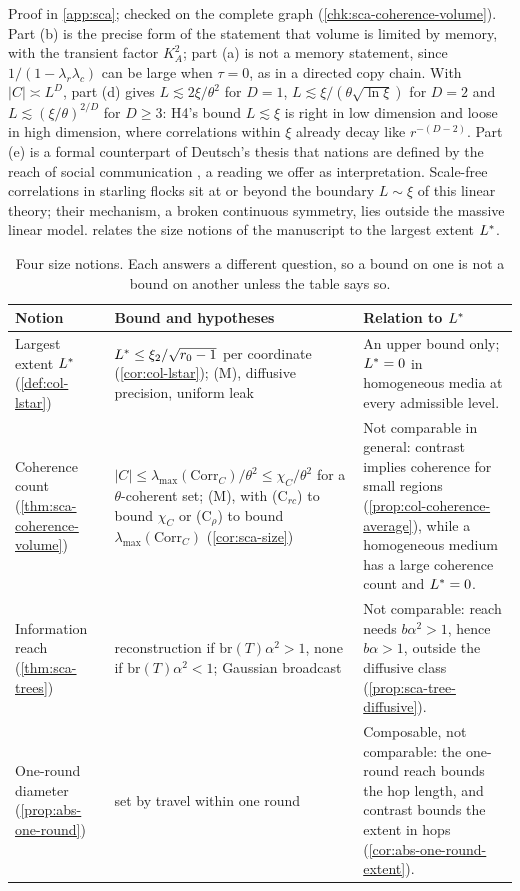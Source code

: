Proof in \cref{app:sca}; checked on the complete graph (\cref{chk:sca-coherence-volume}). Part (b) is the precise form of the statement that volume is limited by memory, with the transient factor $K_A^2$; part (a) is not a memory statement, since $1/(1-\lambda_r\lambda_c)$ can be large when $\tau=0$, as in a directed copy chain. With $|C|\asymp L^D$, part (d) gives $L\lesssim2\xi/\theta^2$ for $D=1$, $L\lesssim\xi/(\theta\sqrt{\ln\xi})$ for $D=2$ and $L\lesssim(\xi/\theta)^{2/D}$ for $D\ge3$: H4's bound $L\lesssim\xi$ is right in low dimension and loose in high dimension, where correlations within $\xi$ already decay like $r^{-(D-2)}$. Part (e) is a formal counterpart of Deutsch's thesis that nations are defined by the reach of social communication \citep{deutsch1953nationalism}, a reading we offer as interpretation. Scale-free correlations in starling flocks \citep{cavagna2010scale} sit at or beyond the boundary $L\sim\xi$ of this linear theory; their mechanism, a broken continuous symmetry, lies outside the massive linear model.  relates the size notions of the manuscript to the largest extent $L^{\ast}$.

\begin{table}[t]
\centering
\small
\begin{tabular}{@{}>{\raggedright\arraybackslash}p{}>{\raggedright\arraybackslash}p{}>{\raggedright\arraybackslash}p{}@{}}
\toprule
Notion & Bound and hypotheses & Relation to $L^{\ast}$\\
\midrule
Largest extent $L^{\ast}$ (\cref{def:col-lstar}) & $L^{\ast}\le\xi_2/\sqrt{r_0-1}$ per coordinate (\cref{cor:col-lstar}); \textup{(M)}, diffusive precision, uniform leak & An upper bound only; $L^{\ast}=0$ in homogeneous media at every admissible level.\\
Coherence count (\cref{thm:sca-coherence-volume}) & $|C|\le\lambda_{\max}(\mathrm{Corr}_C)/\theta^2\le\chi_C/\theta^2$ for a $\theta$-coherent set; \textup{(M)}, with \textup{(C$_{rc}$)} to bound $\chi_C$ or \textup{(C$_\rho$)} to bound $\lambda_{\max}(\mathrm{Corr}_C)$ (\cref{cor:sca-size}) & Not comparable in general: contrast implies coherence for small regions (\cref{prop:col-coherence-average}), while a homogeneous medium has a large coherence count and $L^{\ast}=0$.\\
Information reach (\cref{thm:sca-trees}) & reconstruction if $\mathrm{br}(T)\alpha^2>1$, none if $\mathrm{br}(T)\alpha^2<1$; Gaussian broadcast & Not comparable: reach needs $b\alpha^2>1$, hence $b\alpha>1$, outside the diffusive class (\cref{prop:sca-tree-diffusive}).\\
One-round diameter (\cref{prop:abs-one-round}) & set by travel within one round & Composable, not comparable: the one-round reach bounds the hop length, and contrast bounds the extent in hops (\cref{cor:abs-one-round-extent}).\\
\bottomrule
\end{tabular}
\caption{Four size notions. Each answers a different question, so a bound on one is not a bound on another unless the table says so.}
\label{tab:sca-sizes}
\end{table}

